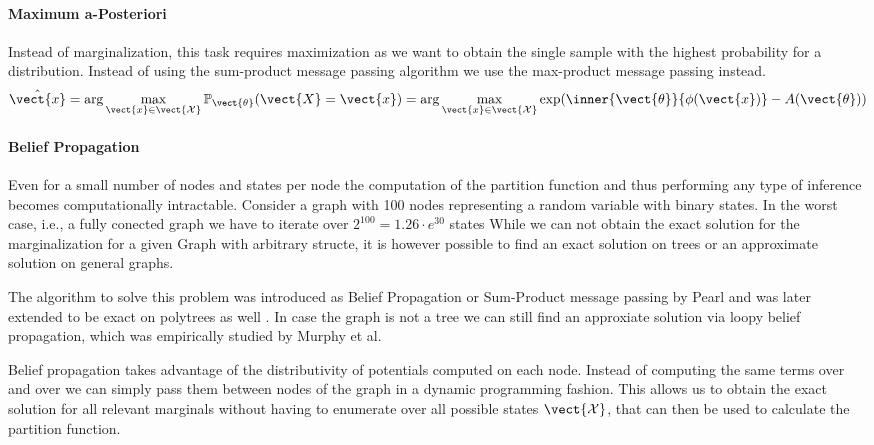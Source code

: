 \paragraph*{Maximum a-Posteriori}
Instead of marginalization, this task requires maximization as we want to obtain the single sample with the highest probability for a distribution. 
Instead of using the sum-product message passing algorithm we use the max-product message passing instead.
\begin{equation}
    \label{eq:map}
    \hat{\vect{x}} = \arg\max_{\vect{x} \in \vect{\mathcal{X}}} \mathbb{P}_{\vect{\theta}}(\vect{X} = \vect{x}) = \arg\max_{\vect{x} \in \vect{\mathcal{X}}} \exp(\inner{\vect{\theta}}{\phi(\vect{x})} - A(\vect{\theta}))
\end{equation}

\paragraph*{Belief Propagation}
Even for a small number of nodes and states per node the computation of the partition function and thus performing any type of inference becomes computationally intractable.
Consider a graph with 100 nodes representing a random variable with binary states.
In the worst case, i.e., a fully conected graph we have to iterate over $2^{100} = 1.26\cdot e^{30}$ states
While we can not obtain the exact solution for the marginalization for a given Graph with arbitrary structe, it is however possible to find an exact solution on trees or an approximate solution on general graphs.


The algorithm to solve this problem was introduced as Belief Propagation or Sum-Product message passing by Pearl \cite{pearl1982reverend} and was later extended to be exact on polytrees as well \cite{kim1983computational}.
In case the graph is not a tree we can still find an approxiate solution via loopy belief propagation, which was empirically studied by Murphy et al. \cite{murphy2013loopy}

Belief propagation takes advantage of the distributivity of potentials computed on each node. 
Instead of computing the same terms over and over we can simply pass them between nodes of the graph in a dynamic programming fashion.
This allows us to obtain the exact solution for all relevant marginals without having to enumerate over all possible states $\vect{\mathcal{X}}$, that can then be used to calculate the partition function.

